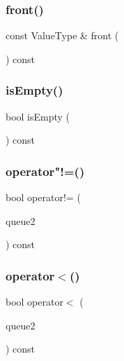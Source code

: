 \mbox{\label{classQueue_a02aaa52ad7a120201f6dd3e90eff737f}} 
\subsubsection{\texorpdfstring{front()}{front()}}
{\footnotesize\ttfamily const Value\+Type \& front (\begin{DoxyParamCaption}{ }\end{DoxyParamCaption}) const}

\mbox{\label{classQueue_acf82f9b2937375c7b1cf3dccb3df3312}} 
\subsubsection{\texorpdfstring{is\+Empty()}{isEmpty()}}
{\footnotesize\ttfamily bool is\+Empty (\begin{DoxyParamCaption}{ }\end{DoxyParamCaption}) const}

\mbox{\label{classQueue_a385dafd253f98c0a2cec02b5c077cc2e}} 
\subsubsection{\texorpdfstring{operator"!=()}{operator!=()}}
{\footnotesize\ttfamily bool operator!= (\begin{DoxyParamCaption}\item[{const \mbox{\hyperlink{classQueue}{Queue}}$<$ Value\+Type $>$ \&}]{queue2 }\end{DoxyParamCaption}) const}

\mbox{\label{classQueue_ad2043e6acdbba5a438b040a2ceda3db7}} 
\subsubsection{\texorpdfstring{operator$<$()}{operator<()}}
{\footnotesize\ttfamily bool operator$<$ (\begin{DoxyParamCaption}\item[{const \mbox{\hyperlink{classQueue}{Queue}}$<$ Value\+Type $>$ \&}]{queue2 }\end{DoxyParamCaption}) const}

